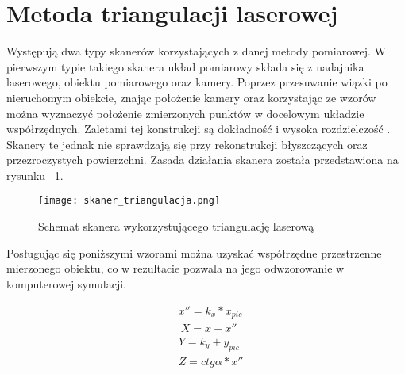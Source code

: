 \documentclass{pginz}
\begin{document}
\section{Metoda triangulacji laserowej}
Występują dwa typy skanerów korzystających z danej metody pomiarowej. W pierwszym typie takiego skanera układ pomiarowy składa się z nadajnika laserowego, obiektu pomiarowego oraz kamery. Poprzez przesuwanie wiązki po nieruchomym obiekcie, znając położenie kamery oraz korzystając ze wzorów \cite{mikulski2013metody} można wyznaczyć położenie zmierzonych punktów w docelowym układzie współrzędnych. Zaletami tej konstrukcji są dokładność i wysoka rozdzielczość \cite{nowacki2018pomiar}. Skanery te jednak nie sprawdzają się przy rekonstrukcji błyszczących oraz przezroczystych powierzchni. Zasada działania skanera została przedstawiona na rysunku ~\ref{fig:triangPic}.

\begin{figure}[H]
  \centering
  \texttt{[image: skaner\_triangulacja.png]}
  \caption{Schemat skanera wykorzystującego triangulację laserową \cite{mikulski2013metody}}   
  \label{fig:triangPic}
\end{figure}

Posługując się poniższymi wzorami można uzyskać współrzędne przestrzenne mierzonego obiektu, co w rezultacie pozwala na jego odwzorowanie w komputerowej symulacji.


    


\begin{equation}
    \begin{aligned}
        & x''=k_{x} *x_{pic}\\
        & \ X=x+x'' \\
      & Y=k_{y}+y_{pic} \\
      & Z=ctg\alpha *x''\\
          
    \end{aligned}
\end{equation}
\end{document}
